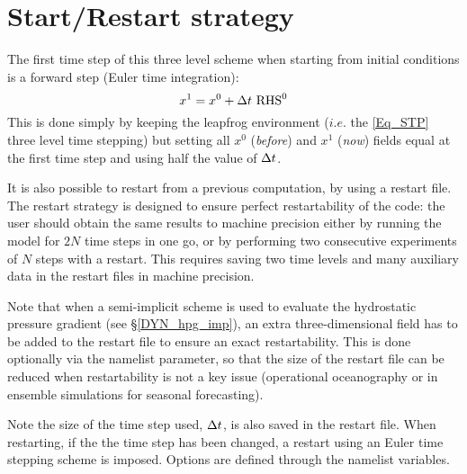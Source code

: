 \documentclass[NEMO_book]{subfiles}
\begin{document}
\section{Start/Restart strategy}
\label{STP_rst}

The first time step of this three level scheme when starting from initial conditions 
is a forward step (Euler time integration): 
\begin{equation} \label{Eq_DOM_euler}
	x^1 = x^0 + \Delta t \ \text{RHS}^0
\end{equation}
This is done simply by keeping the leapfrog environment ($i.e.$ the \eqref{Eq_STP} 
three level time stepping) but setting all $x^0$ (\textit{before}) and $x^{1}$ (\textit{now}) fields 
equal at the first time step and using half the value of $\Delta t$.

It is also possible to restart from a previous computation, by using a 
restart file. The restart strategy is designed to ensure perfect 
restartability of the code: the user should obtain the same results to 
machine precision either by running the model for $2N$ time steps in one go, 
or by performing two consecutive experiments of $N$ steps with a restart. 
This requires saving two time levels and many auxiliary data in the restart 
files in machine precision. 

Note that when a semi-implicit scheme is used to evaluate the hydrostatic pressure 
gradient (see \S\ref{DYN_hpg_imp}), an extra three-dimensional field has to be 
added to the restart file to ensure an exact restartability. This is done optionally 
via the   namelist parameter, so that the size of the
restart file can be reduced when restartability is not a key issue (operational 
oceanography or in ensemble simulations for seasonal forecasting).

Note the size of the time step used, $\Delta t$, is also saved in the restart file. 
When restarting, if the the time step has been changed, a restart using an Euler time 
stepping scheme is imposed. 
Options are defined through the   namelist variables.
\end{document}

